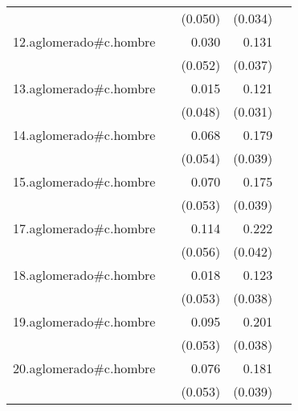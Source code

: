 {\begin{longtable}{l*{4}{D{.}{.}{-1}}}
            &                     &     (0.050)         &     (0.034)         &                     \\
\addlinespace
12.aglomerado#c.hombre&                     &       0.030         &       0.131\sym{***}&                     \\
            &                     &     (0.052)         &     (0.037)         &                     \\
\addlinespace
13.aglomerado#c.hombre&                     &       0.015         &       0.121\sym{***}&                     \\
            &                     &     (0.048)         &     (0.031)         &                     \\
\addlinespace
14.aglomerado#c.hombre&                     &       0.068         &       0.179\sym{***}&                     \\
            &                     &     (0.054)         &     (0.039)         &                     \\
\addlinespace
15.aglomerado#c.hombre&                     &       0.070         &       0.175\sym{***}&                     \\
            &                     &     (0.053)         &     (0.039)         &                     \\
\addlinespace
17.aglomerado#c.hombre&                     &       0.114\sym{*}  &       0.222\sym{***}&                     \\
            &                     &     (0.056)         &     (0.042)         &                     \\
\addlinespace
18.aglomerado#c.hombre&                     &       0.018         &       0.123\sym{**} &                     \\
            &                     &     (0.053)         &     (0.038)         &                     \\
\addlinespace
19.aglomerado#c.hombre&                     &       0.095         &       0.201\sym{***}&                     \\
            &                     &     (0.053)         &     (0.038)         &                     \\
\addlinespace
20.aglomerado#c.hombre&                     &       0.076         &       0.181\sym{***}&                     \\
            &                     &     (0.053)         &     (0.039)         &                     \\

\end{longtable}}

